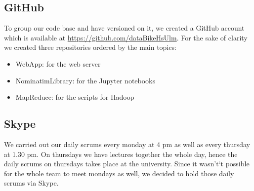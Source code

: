 \subsection{GitHub}
To group our code base and have versioned on it, we created a GitHub account which is available at 
\href{https://github.com/dataBikeHsUlm}{https://github.com/dataBikeHsUlm}.
For the sake of clarity we created three repositories ordered by the main topics:
\begin{itemize}
\item WebApp: for the web server
\item NominatimLibrary: for the Jupyter notebooks
\item MapReduce: for the scripts for Hadoop
\end{itemize}
\subsection{Skype}
We carried out our daily scrums every monday at 4 pm as well as every thursday at 1.30 pm. On thursdays we have lectures together the whole day, hence the daily scrums on thursdays takes place at the university. Since it wasn't`t possible for the whole team to meet mondays as well, we decided to hold those daily scrums via Skype.
